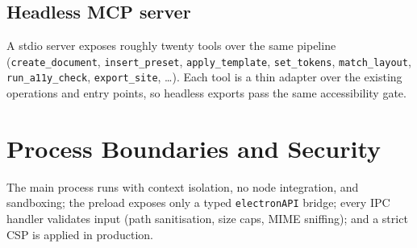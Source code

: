 \subsection{Headless MCP server}
A stdio server exposes roughly twenty tools over the same pipeline
(\texttt{create\_document}, \texttt{insert\_preset}, \texttt{apply\_template},
\texttt{set\_tokens}, \texttt{match\_layout}, \texttt{run\_a11y\_check},
\texttt{export\_site}, \ldots). Each tool is a thin adapter over the existing
operations and entry points, so headless exports pass the same accessibility gate.

\section{Process Boundaries and Security}
The main process runs with context isolation, no node integration, and sandboxing;
the preload exposes only a typed \texttt{electronAPI} bridge; every IPC handler
validates input (path sanitisation, size caps, MIME sniffing); and a strict CSP is
applied in production.
